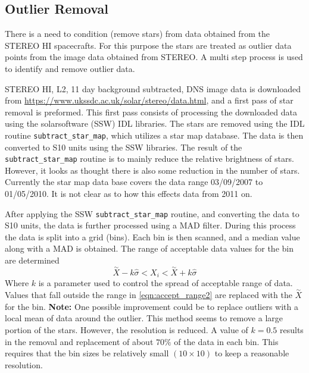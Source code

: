 \subsection{Outlier Removal}
There is a need to condition (remove stars) from data obtained from the STEREO HI spacecrafts. For this purpose the stars are treated as outlier data points from the image data obtained from STEREO. A multi step process is used to identify and remove outlier data.

STEREO HI, L2, 11 day background subtracted, DNS image data is downloaded from \url{https://www.ukssdc.ac.uk/solar/stereo/data.html}, and a first pass of star removal is preformed. This first pass consists of processing the downloaded data using the solarsoftware (SSW) IDL libraries. The stars are removed using the IDL routine \verb|subtract_star_map|, which utilizes a star map database. The data is then converted to S10 units using the SSW libraries. The result of the \verb|subtract_star_map| routine is to mainly reduce the relative brightness of stars. However, it looks as thought there is also some reduction in the number of stars. Currently the star map data base covers the data range 03/09/2007 to 01/05/2010. It is not clear as to how this effects data from 2011 on.

After applying the SSW \verb|subtract_star_map| routine, and converting the data to S10 units, the data is further processed using a MAD filter. During this process the data is split into a grid (bins). Each bin is then scanned, and a median value along with a MAD is obtained. The range of acceptable data values for the bin are determined
\begin{equation}
  \overset{\sim}{X} - k \hat{\sigma} < X_i < \overset{\sim}{X} + k \hat{\sigma}
  \label{eqn:accept_range2}
\end{equation}
Where $k$ is a parameter used to control the spread of acceptable range of data. Values that fall outside the range in \ref{eqn:accept_range2} are replaced with the $\overset{\sim}{X}$ for the bin. \textbf{Note:} One possible improvement could be to replace outliers with a local mean of data around the outlier. This method seems to remove a large portion of the stars. However, the resolution is reduced. A value of $k = 0.5$ results in the removal and replacement of about $70\%$ of the data in each bin. This requires that the bin sizes be relatively small $\left(10 \times 10\right)$ to keep a reasonable resolution.

